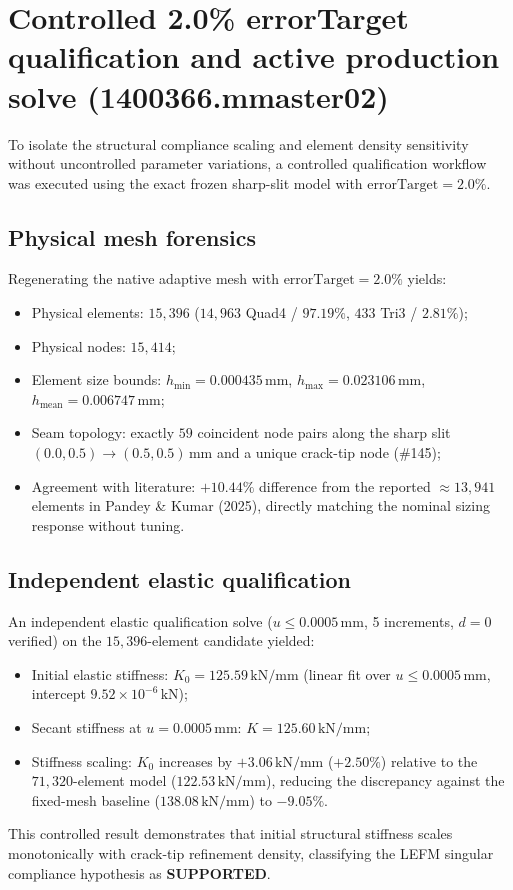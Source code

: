 \section{Controlled 2.0\% errorTarget qualification and active production solve (1400366.mmaster02)}
To isolate the structural compliance scaling and element density sensitivity without uncontrolled parameter variations, a controlled qualification workflow was executed using the exact frozen sharp-slit model with $\text{errorTarget} = 2.0\%$.

\subsection{Physical mesh forensics}
Regenerating the native adaptive mesh with $\text{errorTarget} = 2.0\%$ yields:
\begin{itemize}
  \item Physical elements: $15{,}396$ ($14{,}963$ Quad4 / $97.19\%$, $433$ Tri3 / $2.81\%$);
  \item Physical nodes: $15{,}414$;
  \item Element size bounds: $h_{\min} = 0.000435\,\mathrm{mm}$, $h_{\max} = 0.023106\,\mathrm{mm}$, $h_{\text{mean}} = 0.006747\,\mathrm{mm}$;
  \item Seam topology: exactly $59$ coincident node pairs along the sharp slit $(0.0, 0.5) \to (0.5, 0.5)\,\mathrm{mm}$ and a unique crack-tip node (\#145);
  \item Agreement with literature: $+10.44\%$ difference from the reported $\approx 13{,}941$ elements in Pandey \& Kumar (2025), directly matching the nominal sizing response without tuning.
\end{itemize}

\subsection{Independent elastic qualification}
An independent elastic qualification solve ($u \le 0.0005\,\mathrm{mm}$, 5 increments, $d=0$ verified) on the $15{,}396$-element candidate yielded:
\begin{itemize}
  \item Initial elastic stiffness: $K_0 = 125.59\,\mathrm{kN/mm}$ (linear fit over $u \le 0.0005\,\mathrm{mm}$, intercept $9.52 \times 10^{-6}\,\mathrm{kN}$);
  \item Secant stiffness at $u = 0.0005\,\mathrm{mm}$: $K = 125.60\,\mathrm{kN/mm}$;
  \item Stiffness scaling: $K_0$ increases by $+3.06\,\mathrm{kN/mm}$ ($+2.50\%$) relative to the $71{,}320$-element model ($122.53\,\mathrm{kN/mm}$), reducing the discrepancy against the fixed-mesh baseline ($138.08\,\mathrm{kN/mm}$) to $-9.05\%$.
\end{itemize}
This controlled result demonstrates that initial structural stiffness scales monotonically with crack-tip refinement density, classifying the LEFM singular compliance hypothesis as \textbf{SUPPORTED}.

